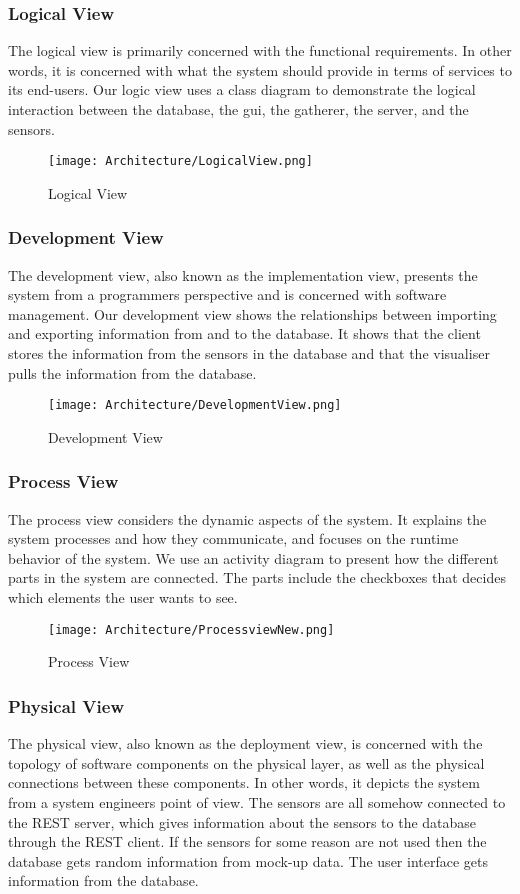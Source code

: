 \documentclass[../document.tex]{subfiles}
\begin{document}
\subsubsection{Logical View}		
The logical view is primarily concerned with the functional requirements. In other words, it is concerned with what the system should provide in terms of services to its end-users. Our logic view uses a class diagram to demonstrate the logical interaction between the database, the gui, the gatherer, the server, and the sensors. 


\begin{figure}[H]
	\centering
	\texttt{[image: Architecture/LogicalView.png]}
	\caption{Logical View}
\end{figure}

\subsubsection{Development View}
The development view, also known as the implementation view,  presents the system from a programmers perspective and is concerned with software management. Our development view shows the relationships between importing and exporting information from and to the database. It shows that the client stores the information from the sensors in the database and that the visualiser pulls the information from the database.

\begin{figure}[H]
	\centering
	\texttt{[image: Architecture/DevelopmentView.png]}
	\caption{Development View}
\end{figure}

\subsubsection{Process View}
The process view considers the dynamic aspects of the system. It explains the system processes and how they communicate, and focuses on the runtime behavior of the system. We use an activity diagram to present how the different parts in the system are connected. The parts include the checkboxes that decides which elements the user wants to see. 

\begin{figure}[H]
	\centering
	\texttt{[image: Architecture/ProcessviewNew.png]}
	\caption{Process View}
\end{figure}

\subsubsection{Physical View}
The physical view, also known as the deployment view, is concerned with the topology of software components on the physical layer, as well as the physical connections between these components. In other words, it depicts the system from a system engineers point of view. The sensors are all somehow connected to the REST server, which gives information about the sensors to the database through the REST client. If the sensors for some reason are not used then the database gets random information from mock-up data. The user interface gets information from the database.
\end{document}
